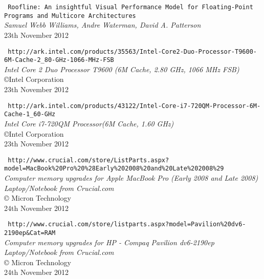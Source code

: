 \documentclass[a4paper,10pt,openright,openbib]{article}
\begin{document}
\begin{thebibliography}{9}
	\texttt{\small
	Roofline: An insightful Visual Performance Model for Floating-Point Programs and Multicore Architectures}	\\
	\emph{Samuel Webb Williams, Andre Waterman, David A. Patterson}	\\
	23th November 2012

	\texttt{\small
	http://ark.intel.com/products/35563/Intel-Core2-Duo-Processor-T9600-6M-Cache-2_80-GHz-1066-MHz-FSB}	\\
	\emph{Intel{\textregistered} Core {\texttrademark} 2 Duo Processor T9600 (6M Cache, 2.80 GHz, 1066 MHz FSB)}	\\
	{\copyright}Intel Corporation	\\
	23th November 2012

	\texttt{\small
	http://ark.intel.com/products/43122/Intel-Core-i7-720QM-Processor-6M-Cache-1_60-GHz}	\\
	\emph{Intel{\textregistered} Core {\texttrademark} i7-720QM Processor(6M Cache, 1.60 GHz)}	\\
	{\copyright}Intel Corporation	\\
	23th November 2012

	\texttt{\small
	http://www.crucial.com/store/ListParts.aspx?model=MacBook\%20Pro\%20\%28Early\%202008\%20and\%20Late\%202008\%29}	\\
	\emph{Computer memory upgrades for Apple MacBook Pro (Early 2008 and Late 2008) Laptop/Notebook from Crucial.com }	\\
	{\copyright} Micron Technology	\\
	24th November 2012

	\texttt{\small
	http://www.crucial.com/store/listparts.aspx?model=Pavilion\%20dv6-2190ep&Cat=RAM}	\\
	\emph{Computer memory upgrades for HP - Compaq Pavilion dv6-2190ep Laptop/Notebook from Crucial.com}	\\
	{\copyright} Micron Technology	\\
	24th November 2012	

\end{thebibliography}
\end{document}
